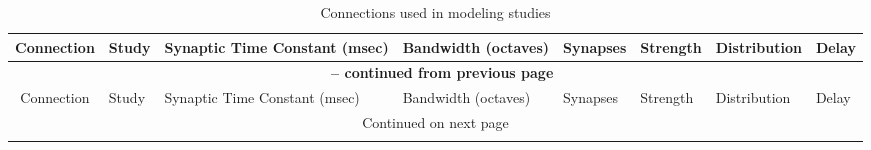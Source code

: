 \begin{longtable}{cXXXXXXX}%
%
\caption{Connections  used in modeling studies} \\
\toprule  
           Connection            &                                                                  Study                                                                   &                                          Synaptic Time Constant (msec)                                          &                    Bandwidth (octaves)                    &                 Synapses                  &                                          Strength                                           &               Distribution                & Delay\\ \midrule 
\endfirsthead

\multicolumn{8}{c}{{\bfseries \tablename\ \thetable{} -- continued from previous page}} \\
      \midrule  Connection       &                                                                  Study                                                                   &                                          Synaptic Time Constant (msec)                                          &                    Bandwidth (octaves)                    &                  Synapses                 &                                          Strength                                           &               Distribution                & Delay\\ \midrule 
\endhead

\midrule \multicolumn{8}{c}{{Continued on next page}} \\ %
\endfoot
\bottomrule
\endlastfoot


\end{longtable}
